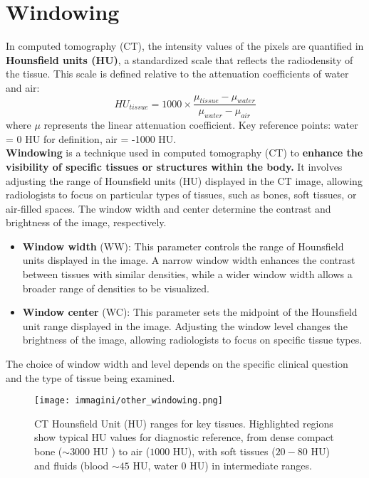 \section{Windowing}
In computed tomography (CT), the intensity values of the pixels are quantified in \textbf{Hounsfield units (HU)}, a standardized scale that reflects the radiodensity of the tissue. This scale is defined relative to the attenuation coefficients of water and air:
\begin{equation}
    HU_{tissue} = 1000 \times \dfrac{\mu_{tissue} - \mu_{water}}{\mu_{water}-\mu_{air}}
\end{equation}
where $\mu$ represents the linear attenuation coefficient. Key reference points: water = 0 HU for definition, air = -1000 HU. \\
\textbf{Windowing} is a technique used in computed tomography (CT) to \textbf{enhance the visibility of specific tissues or structures within the body.} It involves adjusting the range of Hounsfield units (HU) displayed in the CT image, allowing radiologists to focus on particular types of tissues, such as bones, soft tissues, or air-filled spaces. The window width and center determine the contrast and brightness of the image, respectively.
\begin{itemize}
    \item \textbf{Window width} (WW): This parameter controls the range of Hounsfield units displayed in the image. A narrow window width enhances the contrast between tissues with similar densities, while a wider window width allows a broader range of densities to be visualized.
    \item \textbf{Window center} (WC): This parameter sets the midpoint of the Hounsfield unit range displayed in the image. Adjusting the window level changes the brightness of the image, allowing radiologists to focus on specific tissue types.
\end{itemize}
The choice of window width and level depends on the specific clinical question and the type of tissue being examined. 

\begin{figure}
    \centering
    \texttt{[image: immagini/other\_windowing.png]}
    \caption{CT Hounsfield Unit (HU) ranges for key tissues. Highlighted regions show typical HU values for diagnostic reference, from dense compact bone ($\sim 3000$ HU ) to air ($1000$ HU), with soft tissues ($20-80$ HU) and fluids (blood $\sim 45$ HU, water $0$ HU) in intermediate ranges.}
    \label{fig:general_windowing}
\end{figure}

